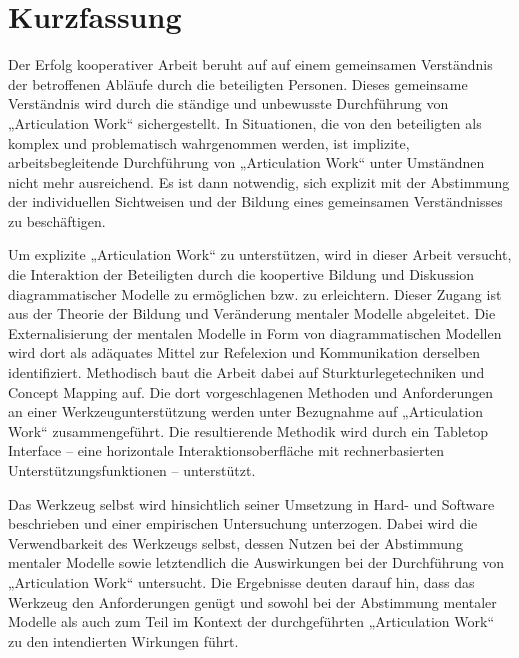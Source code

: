 
\section*{Kurzfassung}
Der Erfolg kooperativer Arbeit beruht auf auf einem gemeinsamen Verständnis der betroffenen Abläufe durch die beteiligten Personen. Dieses gemeinsame Verständnis wird durch die ständige und unbewusste Durchführung von „Articulation Work“ sichergestellt. In Situationen, die von den beteiligten als komplex und problematisch wahrgenommen werden, ist implizite, arbeitsbegleitende Durchführung von „Articulation Work“ unter Umständnen nicht mehr ausreichend. Es ist dann notwendig, sich explizit mit der Abstimmung der individuellen Sichtweisen und der Bildung eines gemeinsamen Verständnisses zu beschäftigen.

Um explizite „Articulation Work“ zu unterstützen, wird in dieser Arbeit versucht, die Interaktion der Beteiligten durch die koopertive Bildung und Diskussion diagrammatischer Modelle zu ermöglichen bzw. zu erleichtern. Dieser Zugang ist aus der Theorie der Bildung und Veränderung mentaler Modelle abgeleitet. Die Externalisierung der mentalen Modelle in Form von diagrammatischen Modellen wird dort als adäquates Mittel zur Refelexion und Kommunikation derselben identifiziert. Methodisch baut die Arbeit dabei auf Sturkturlegetechniken und Concept Mapping auf. Die dort vorgeschlagenen Methoden und Anforderungen an einer Werkzeugunterstützung werden unter Bezugnahme auf „Articulation Work“ zusammengeführt. Die resultierende Methodik wird durch ein Tabletop Interface -- eine horizontale Interaktionsoberfläche mit rechnerbasierten Unterstützungsfunktionen -- unterstützt.

Das Werkzeug selbst wird hinsichtlich seiner Umsetzung in Hard- und Software beschrieben und einer empirischen Untersuchung unterzogen. Dabei wird die Verwendbarkeit des Werkzeugs selbst, dessen Nutzen bei der Abstimmung mentaler Modelle sowie letztendlich die Auswirkungen bei der Durchführung von „Articulation Work“ untersucht. Die Ergebnisse deuten darauf hin, dass das Werkzeug den Anforderungen genügt und sowohl bei der Abstimmung mentaler Modelle als auch zum Teil im Kontext der durchgeführten „Articulation Work“ zu den intendierten Wirkungen führt.
